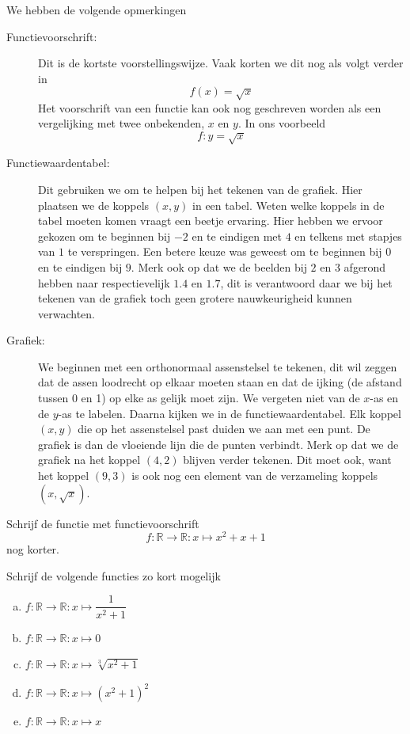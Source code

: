 \documentclass[12pt,twoside]{article}
\begin{document}
\begin{theorie}
We hebben de volgende opmerkingen
\begin{description}
\item[Functievoorschrift:] Dit is de kortste voorstellingswijze. Vaak korten we dit nog als volgt verder in
  $$f(x)=\sqrt{x}$$
  Het voorschrift van een functie kan ook nog geschreven worden als een vergelijking met twee onbekenden, $x$ en $y$. In ons voorbeeld
  $$f: y=\sqrt{x}$$
\item[Functiewaardentabel:] Dit gebruiken we om te helpen bij het tekenen van de grafiek. Hier plaatsen we de koppels $(x,y)$ in een tabel. Weten welke koppels in de tabel moeten komen vraagt een beetje ervaring. Hier hebben we ervoor gekozen om te beginnen bij $-2$ en te eindigen met $4$ en telkens met stapjes van $1$ te verspringen. Een betere keuze was geweest om te beginnen bij $0$ en te eindigen bij $9$. Merk ook op dat we de beelden bij $2$ en $3$ afgerond hebben naar respectievelijk $1.4$ en $1.7$, dit is verantwoord daar we bij het tekenen van de grafiek toch geen grotere nauwkeurigheid kunnen verwachten.
\item[Grafiek:] We beginnen met een orthonormaal assenstelsel te tekenen, dit wil zeggen dat de assen loodrecht op elkaar moeten staan en dat de ijking (de afstand tussen 0 en 1) op elke as gelijk moet zijn. We vergeten niet van de $x$-as en de $y$-as te labelen. Daarna kijken we in de functiewaardentabel. Elk koppel $(x,y)$ die op het assenstelsel past duiden we aan met een punt. De grafiek is dan de vloeiende lijn die de punten verbindt. Merk op dat we de grafiek na het koppel $(4,2)$ blijven verder tekenen. Dit moet ook, want het koppel $(9,3)$ is ook nog een element van de verzameling koppels $(x,\sqrt{x})$.
\end{description}

\end{theorie}

\begin{oefening}
  Schrijf de functie met functievoorschrift
  $$f:\mathbb{R}\to\mathbb{R}:x\mapsto x^2+x+1$$
  nog korter.
\end{oefening}

\begin{oefening}
  Schrijf de volgende functies zo kort mogelijk
  \begin{enumerate}[(a)]
  \itemsep.5em
  \item $f:\mathbb{R}\to\mathbb{R}:x\mapsto \dfrac{1}{x^2+1}$
  \item $f:\mathbb{R}\to\mathbb{R}:x\mapsto 0$
  \item $f:\mathbb{R}\to\mathbb{R}:x\mapsto \sqrt[3]{x^2+1}$
  \item $f:\mathbb{R}\to\mathbb{R}:x\mapsto \left(x^2+1\right)^2$
  \item $f:\mathbb{R}\to\mathbb{R}:x\mapsto x$
  \end{enumerate}
\end{oefening}
\end{document}
